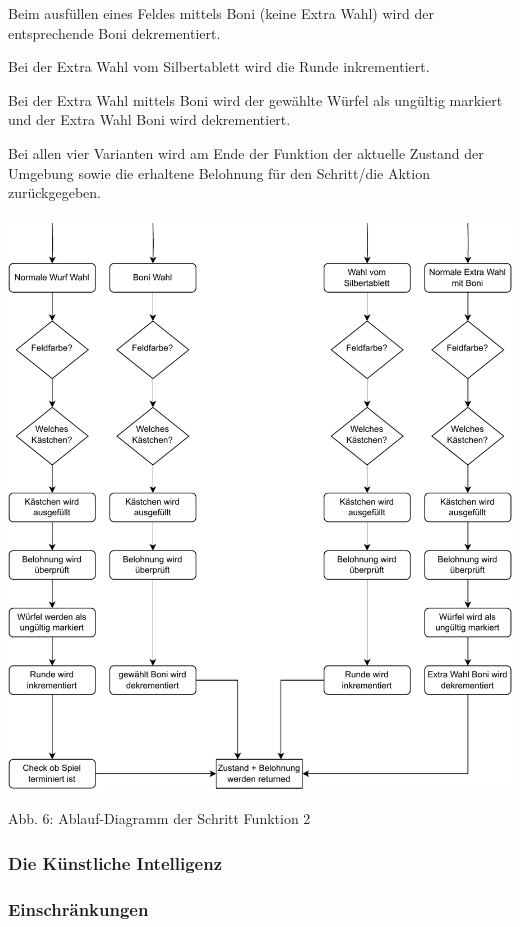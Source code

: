 Beim ausfüllen eines Feldes mittels Boni (keine Extra Wahl) wird der entsprechende Boni dekrementiert.

Bei der Extra Wahl vom Silbertablett wird die Runde inkrementiert.

Bei der Extra Wahl mittels Boni wird der gewählte Würfel als ungültig markiert und der Extra Wahl Boni wird dekrementiert.

Bei allen vier Varianten wird am Ende der Funktion der aktuelle Zustand der Umgebung sowie die erhaltene Belohnung für den Schritt/die Aktion zurückgegeben.\\

\begin{minipage}{\linewidth}

	\vspace{0.5cm}
	\includegraphics[width=1\textwidth]{Bilder/step2.drawio}
	
	Abb. 6: Ablauf-Diagramm der Schritt Funktion 2 \\
\end{minipage}
\subsubsection{Die Künstliche Intelligenz}
\subsubsection{Einschränkungen}